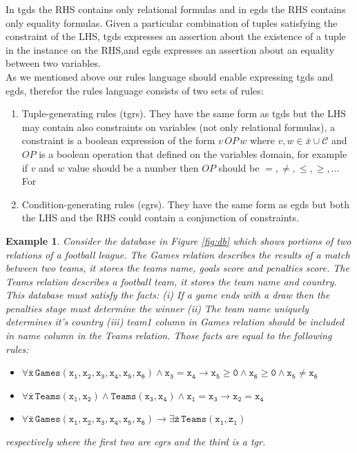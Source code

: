 \documentclass{vldb}
\newtheorem{example}{Example}
\begin{document}
In tgds the RHS contains only relational formulas and in egds the RHS contains only equality formulas. Given a particular combination of tuples satisfying the constraint of the LHS, tgds expresses an assertion about the existence of a tuple in the instance on the RHS,and egds expresses an assertion about an equality between two variables.\\
As we mentioned above our rules language should enable expressing tgds and egds, therefor the rules language consists of two sets of rules:
\begin{enumerate}
\item Tuple-generating rules (tgrs). They have the same form as tgds but the LHS may contain also constraints on variables (not only relational formulas), a constraint is a boolean expression of the form $v \, OP \, w$ where $v,w \in {\bar{x}}\cup \mathcal{C}$ and $OP$ is a boolean operation that defined on the variables domain, for example if $v$ and $w$ value should be a number then $OP$ should be $=,\neq,\leq,\geq,...$ \\
For    
\item Condition-generating rules (cgrs). They have the same form as egds but both the LHS and the RHS could contain a conjunction of constraints. 
\end{enumerate}  

\begin{example}
Consider the database in Figure \ref{fig:db} which shows portions of two relations of a football league. The Games relation describes the results of a match between two teams, it stores the teams name, goals score and penalties score. The Teams relation  describes a football team, it stores the team name and country. This database must satisfy the facts: (i) If a game ends with a draw then the penalties stage must determine the winner (ii) The team name uniquely determines it's country (iii) team1 column in Games relation should be included in name column in the Teams relation. Those facts are equal to the following rules: 
\begin{itemize}
\item $\mathtt{\forall \bar{x} \, Games(x_{1},x_{2},x_{3},x_{4},x_{5},x_{6}) \wedge x_{3}=x_{4} \rightarrow x_{5} \geq 0 \wedge x_{6} \geq 0 \wedge x_{5} \neq x_{6}  }$
\item $\mathtt{\forall \bar{x} \, Teams(x_{1},x_{2}) \wedge Teams(x_{3},x_{4}) \wedge x_{1}=x_{3} \rightarrow x_{2}=x_{4}}$
\item $\mathtt{\forall \bar{x} \, Games(x_{1},x_{2},x_{3},x_{4},x_{5},x_{6}) \rightarrow \exists \bar{z} \, Teams(x_{1},z_{1})}$
\end{itemize}
respectively where the first two are cgrs and the third is a tgr.
\end{example}
\end{document}
